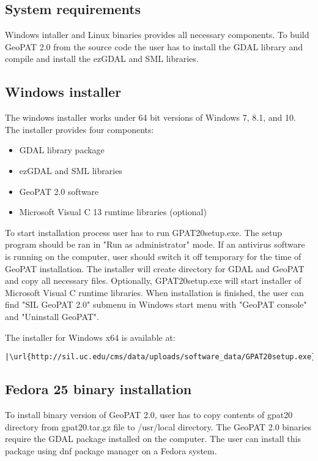 \subsection{System requirements}

Windows intaller and Linux binaries provides all necessary components. 
To build GeoPAT 2.0 from the source code the user has to install the GDAL library and compile and install the ezGDAL and SML libraries.

\subsection{Windows installer}
The windows installer works under 64 bit versions of Windows 7, 8.1, and 10.
The installer provides four components:
\begin{itemize}
  \item{GDAL library package}
  \item{ezGDAL and SML libraries}
  \item{GeoPAT 2.0 software}
  \item{Microsoft Visual C 13 runtime libraries (optional)}
\end{itemize}
To start installation process user has to run GPAT20setup.exe.
The setup program should be ran in "Run as administrator" mode.
If an antivirus software is running on the computer, user should 
switch it off temporary for the time of GeoPAT installation.
The installer will create directory for GDAL and GeoPAT and 
copy all necessary files. Optionally, GPAT20setup.exe will
start installer of Microsoft Visual C runtime libraries.
When installation is finished, the user can find "SIL GeoPAT 2.0"
submenu in Windows start menu with "GeoPAT console" and "Uninstall GeoPAT".

The installer for Windows x64 is available at:

\begin{lstlisting}[escapechar=|]
|\url{http://sil.uc.edu/cms/data/uploads/software_data/GPAT20setup.exe}|
\end{lstlisting}

\subsection{Fedora 25 binary installation}
To install binary version of GeoPAT 2.0, user has to copy contents
of gpat20 directory from gpat20.tar.gz file to /usr/local directory.
The GeoPAT 2.0 binaries require the GDAL package installed on the computer.
The user can install this package using dnf package manager on a Fedora system.

